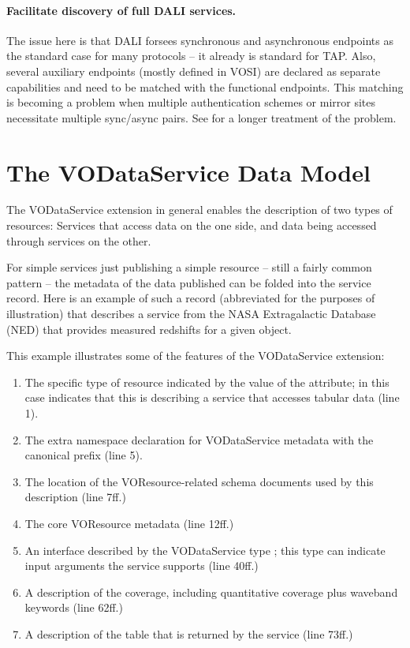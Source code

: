 \documentclass[11pt,a4paper]{ivoa}
\begin{document}
\paragraph{Facilitate discovery of full DALI services.}  The issue here
is that DALI forsees synchronous and asynchronous endpoints as the
standard case for many protocols -- it already is standard for TAP.
Also, several auxiliary endpoints (mostly defined in VOSI) are declared as
separate capabilities and need to be matched with the functional
endpoints.  This matching is becoming a problem when multiple
authentication schemes or mirror sites necessitate multiple sync/async
pairs.  See \citep{note:caproles} for a longer treatment of the problem.


\section{The VODataService Data Model}
\label{sect:model}


The VODataService extension in general enables the description of two
types of resources:  Services that access data on the one side, and data
being accessed through services on the other.

For simple services just publishing a simple resource -- still a fairly
common pattern -- the metadata of the data published can be folded into
the service record.
Here is an example of such a record (abbreviated for the
purposes of illustration) that describes a service from the NASA
Extragalactic Database (NED) that provides measured redshifts for a
given object.




This example illustrates some of the features of the VODataService
extension:

\begin{enumerate}
\item The specific type of resource indicated by
       the value of the  attribute; in this case
        indicates that this is
       describing a service that accesses tabular data (line 1).
\item The extra namespace declaration for
       VODataService metadata with the canonical prefix (line 5).
\item The location of the VOResource-related schema
       documents used by this description (line 7ff.)
\item The core VOResource metadata (line 12ff.)
\item An interface described by the
       VODataService type ; this
       type can indicate input arguments the service supports (line
       40ff.)
\item A description of the
       coverage, including quantitative coverage
       plus waveband keywords (line 62ff.)
\item A description of the table that is returned
       by the service (line 73ff.)
\end{enumerate}
\end{document}
